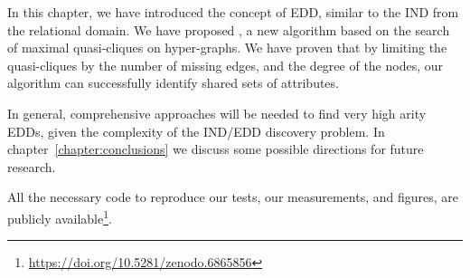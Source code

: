 In this chapter, we have introduced the concept of EDD, similar to the \gls{IND} from
the relational domain. We have proposed \PresQ, a new algorithm based on the search of
maximal quasi-cliques on hyper-graphs. We have proven that by limiting the quasi-cliques
by the number of missing edges, and the degree of the nodes, our algorithm can successfully
identify shared sets of attributes.

In general, comprehensive approaches will be needed to find very high arity \glspl{EDD},
given the complexity of the \gls{IND}/\gls{EDD} discovery problem.
In chapter~\ref{chapter:conclusions} we discuss some possible directions for future research.

All the necessary code to reproduce our tests, our
measurements, and figures, are publicly available\footnote{\url{https://doi.org/10.5281/zenodo.6865856}}.
